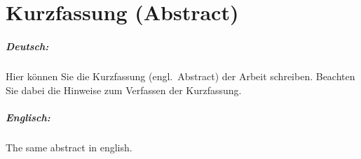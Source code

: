 
\chapter*{Kurzfassung (Abstract)}

\paragraph*{Deutsch:}

Hier können Sie die Kurzfassung (engl.~Abstract) der Arbeit schreiben. Beachten Sie dabei die Hinweise zum Verfassen der Kurzfassung.

\paragraph*{Englisch:}

The same abstract in english.
